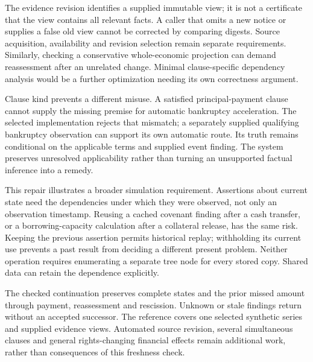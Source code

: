 The evidence revision identifies a supplied immutable view; it is not a
certificate that the view contains all relevant facts. A caller that omits a
new notice or supplies a false old view cannot be corrected by comparing
digests. Source acquisition, availability and revision selection remain
separate requirements. Similarly, checking a conservative whole-economic
projection can demand reassessment after an unrelated change. Minimal
clause-specific dependency analysis would be a further optimization needing
its own correctness argument.

Clause kind prevents a different misuse. A satisfied principal-payment clause
cannot supply the missing premise for automatic bankruptcy acceleration.
The selected implementation rejects that mismatch; a separately supplied
qualifying bankruptcy observation can support its own automatic route.
Its truth remains conditional on the applicable terms and supplied event
finding. The system preserves unresolved applicability rather than turning
an unsupported factual inference into a remedy.

This repair illustrates a broader simulation requirement. Assertions about
current state need the dependencies under which they were observed, not only
an observation timestamp. Reusing a cached covenant finding after a cash
transfer, or a borrowing-capacity calculation after a collateral release,
has the same risk. Keeping the previous assertion permits historical replay;
withholding its current use prevents a past result from deciding a different
present problem. Neither operation requires enumerating a separate tree node
for every stored copy. Shared data can retain the dependence explicitly.

The checked continuation preserves complete states and the prior missed amount
through payment, reassessment and rescission. Unknown or stale findings return
without an accepted successor. The reference covers one selected synthetic
series and supplied evidence views. Automated source revision, several
simultaneous clauses and general rights-changing financial effects remain
additional work, rather than consequences of this freshness check.
